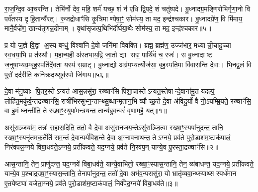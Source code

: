 रा॒ज॒न्दि॒व आ॒चर॑न्ति। तेभि॑र्नो देव॒ महि॒ शर्म॑ यच्छ॒ शं न॑ एधि द्वि॒पदे॒ शं चतु॑ष्पदे। बु॒ध्नादग्र॒मङ्गि॑रोभिर्गृणा॒नो वि पर्व॑तस्य दृहि॒तान्यै॑रत्। रु॒जद्रोधाꣳ॑सि कृ॒त्रिमाण्येषा॒ꣳ॒ सोम॑स्य॒ ता मद॒ इन्द्र॑श्चकार। बु॒ध्नादग्रे॑ण॒ वि मि॑माय॒ मानै॒र्वज्रे॑ण॒ खान्य॑तृणन्न॒दीनाम्। वृथा॑सृजत्प॒थिभि॑र्दीर्घया॒थैः सोम॑स्य॒ ता मद॒ इन्द्र॑श्चकार॥५॥

प्र यो ज॒ज्ञे वि॒द्वा अ॒स्य बन्धुं॒ विश्वा॑नि दे॒वो जनि॑मा विवक्ति। ब्रह्म॒ ब्रह्म॑ण॒ उज्ज॑भार॒ मध्यान्नी॒चादु॒च्चा स्व॒धया॒भि प्र त॑स्थौ। म॒हान्म॒ही अ॑स्तभाय॒द्वि जा॒तो द्या सद्म॒ पार्थि॑वं च॒ रजः॑। स बु॒ध्नादाष्ट ज॒नुषा॒भ्यग्र॒म्बृह॒स्पति॑र्दे॒वता॒ यस्य॑ स॒म्राट्। बु॒ध्नाद्यो अग्र॑म॒भ्यर्त्योज॑सा॒ बृह॒स्पति॒मा वि॑वासन्ति दे॒वाः। भि॒नद्व॒लं वि पुरो॑ दर्दरीति॒ कनि॑क्रद॒थ्सुव॑र॒पो जि॑गाय॥५६॥

{\anuvakamend[{यु॒वं वी॒तमा॒ विवा॑सति॒ पन्था॑नो दीर्घया॒थैः सोम॑स्य॒ ता मद॒ इन्द्र॑श्चकार दे॒वा नव॑ च॥14॥}]}


{}

\setcounter{anuvakam}{0}
दे॒वा म॑नु॒ष्याः पि॒तर॒स्तेऽन्यत॑ आस॒न्नसु॑रा॒ रख्षाꣳ॑सि पिशा॒चास्तेऽन्यत॒स्तेषान्दे॒वाना॑मु॒त यदल्पं॒ लोहि॑त॒मकु॑र्व॒न्तद्रख्षाꣳ॑सि॒ रात्री॑भिरसुभ्न॒न्तान्थ्सु॒ब्धान्मृ॒तान॒भि व्यौच्छ॒त्ते दे॒वा अ॑विदु॒र्यो वै नो॒ऽयम्म्रि॒यते॒ रख्षाꣳ॑सि॒ वा इ॒मं घ्न॒न्तीति॒ ते रख्षा॒ꣳ॒स्युपा॑मन्त्रयन्त॒ तान्य॑ब्रुव॒न्वरं॑ वृणामहै॒ यत्॥१॥

असु॑रा॒ञ्जया॑म॒ तन्नः॑ स॒हास॒दिति॒ ततो॒ वै दे॒वा असु॑रानजय॒न्तेऽसु॑राञ्जि॒त्वा रख्षा॒ꣳ॒स्यपा॑नुदन्त॒ तानि॒ रख्षा॒ꣳ॒स्यनृ॑तमक॒र्तेति॑ सम॒न्तं दे॒वान्पर्य॑विश॒न्ते दे॒वा अ॒ग्नाव॑नाथन्त॒ तेऽग्नये॒ प्रव॑ते पुरो॒डाश॑म॒ष्टाक॑पालं॒ निर॑वपन्न॒ग्नये॑ विबा॒धव॑ते॒ऽग्नये॒ प्रती॑कवते॒ यद॒ग्नये॒ प्रव॑ते नि॒रव॑प॒न् यान्ये॒व पु॒रस्ता॒द्रख्षाꣳ॑सि॥२॥

आस॒न्तानि॒ तेन॒ प्राणु॑दन्त॒ यद॒ग्नये॑ विबा॒धव॑ते॒ यान्ये॒वाभितो॒ रख्षा॒ꣳ॒स्यास॒न्तानि॒ तेन॒ व्य॑बाधन्त॒ यद॒ग्नये॒ प्रती॑कवते॒ यान्ये॒व प॒श्चाद्रख्षा॒ꣳ॒स्यास॒न्तानि॒ तेनापा॑नुदन्त॒ ततो॑ दे॒वा अभ॑व॒न्परासु॑रा॒ यो भ्रातृ॑व्यवा॒न्थ्स्याथ्स स्पर्ध॑मान ए॒तयेष्ट्या॑ यजेता॒ग्नये॒ प्रव॑ते पुरो॒डाश॑म॒ष्टाक॑पालं॒ निर्व॑पेद॒ग्नये॑ विबा॒धव॑ते॥३॥

